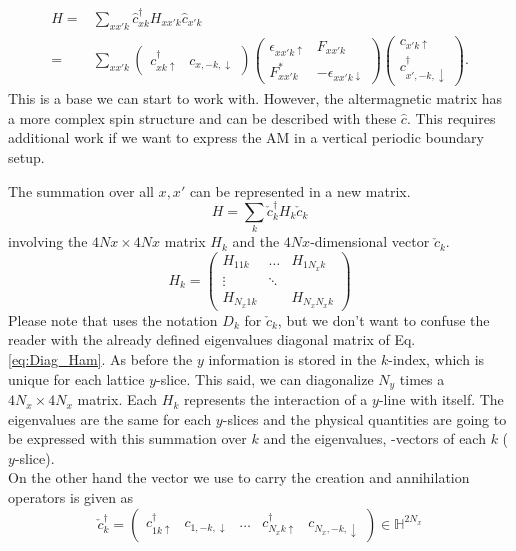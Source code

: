 \documentclass[../main.tex]{subfile}
\begin{document}
\begin{equation}
    \begin{aligned}
    H =& \sum_{xx'k} \hat{c}_{xk}^{\dagger} H_{xx'k} \hat{c}_{x'k}\\
      =& \sum_{xx'k} \begin{pmatrix}
        c^{\dagger}_{xk\uparrow} & c_{x,-k,\downarrow}
      \end{pmatrix}
        \begin{pmatrix}
            \epsilon_{xx'k\uparrow} & F_{xx'k}\\
            F_{xx'k}^{\ast} & -\epsilon_{xx'k\downarrow}
        \end{pmatrix}
        \begin{pmatrix}
            c_{x'k\uparrow}\\
            c^{\dagger}_{x',-k,\downarrow}
        \end{pmatrix}.
    \end{aligned}
\end{equation}
This is a base we can start to work with. However, the altermagnetic matrix has a more complex spin structure and can be described with these $\hat{c}$.
This requires additional work if we want to express the AM in a vertical periodic boundary setup.

The summation over all $x,x'$ can be represented in a new matrix.
\[
    H = \sum_k \check{c}_k^{\dagger} H_k \check{c}_k
\]
involving the $4Nx \times 4Nx$ matrix $H_k$ and the $4Nx$-dimensional vector $\check{c}_k$. 
\[
    H_k = \begin{pmatrix}
        H_{11k} &\dots & H_{1N_xk}\\
        \vdots&\ddots&\\
        H_{N_x1k} & & H_{N_xN_xk}
    \end{pmatrix}
\]
Please note that \cite{Mjos2019} uses the notation $D_k$ for $\check{c}_k$, but we don't want to confuse the reader with the already defined eigenvalues
 diagonal matrix of Eq. \ref{eq:Diag_Ham}.
As before the $y$ information is stored in the $k$-index, which is unique for each lattice $y$-slice. This said, we 
can diagonalize $N_y$ times a $4N_x \times 4N_x$ matrix. Each $H_k$ represents the interaction of a $y$-line with itself.
The eigenvalues are the same for each $y$-slices and the physical
quantities are going to be expressed with this summation over $k$ and the eigenvalues, -vectors of each $k$ ($y$-slice).\\

On the other hand the vector we use to carry the creation and annihilation operators is given as 
\[
    \check{c}_k^{\dagger} = \begin{pmatrix}
        c^{\dagger}_{1k\uparrow} & c_{1,-k,\downarrow}& \dots &c^{\dagger}_{N_x k\uparrow} & c_{N_x,-k,\downarrow}
    \end{pmatrix}\in\mathbb{H}^{2N_x}
\]
\end{document}

